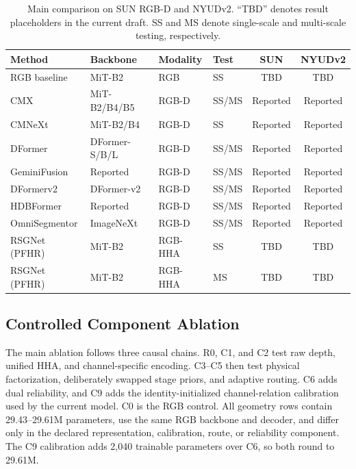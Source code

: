 \documentclass[a4paper,fleqn]{cas-dc}
\begin{document}
\begin{table}%
\caption{Main comparison on SUN RGB-D and NYUDv2. ``TBD'' denotes result placeholders in the current draft. SS and MS denote single-scale and multi-scale testing, respectively.}\label{tab:main}
\begin{tabular*}{\tblwidth}{@{\extracolsep{\fill}}llllcc@{}}
\toprule
Method & Backbone & Modality & Test & SUN & NYUDv2 \\
\midrule
RGB baseline & MiT-B2 & RGB & SS & TBD & TBD \\
CMX & MiT-B2/B4/B5 & RGB-D & SS/MS & Reported & Reported \\
CMNeXt & MiT-B2/B4 & RGB-D & SS & Reported & Reported \\
DFormer & DFormer-S/B/L & RGB-D & SS/MS & Reported & Reported \\
GeminiFusion & Reported & RGB-D & SS/MS & Reported & Reported \\
DFormerv2 & DFormer-v2 & RGB-D & SS/MS & Reported & Reported \\
HDBFormer & Reported & RGB-D & SS/MS & Reported & Reported \\
OmniSegmentor & ImageNeXt & RGB-D & SS/MS & Reported & Reported \\
RSGNet (PFHR) & MiT-B2 & RGB-HHA & SS & TBD & TBD \\
RSGNet (PFHR) & MiT-B2 & RGB-HHA & MS & TBD & TBD \\
\bottomrule
\end{tabular*}
\end{table}

\subsection{Controlled Component Ablation}

The main ablation follows three causal chains. R0, C1, and C2 test raw depth, unified HHA, and channel-specific encoding. C3--C5 then test physical factorization, deliberately swapped stage priors, and adaptive routing. C6 adds dual reliability, and C9 adds the identity-initialized channel-relation calibration used by the current model. C0 is the RGB control. All geometry rows contain 29.43--29.61M parameters, use the same RGB backbone and decoder, and differ only in the declared representation, calibration, route, or reliability component. The C9 calibration adds 2,040 trainable parameters over C6, so both round to 29.61M.
\end{document}
